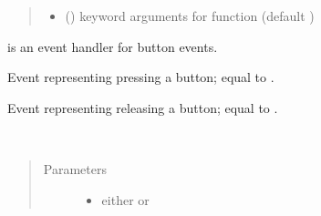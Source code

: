 \documentclass[letterpaper,10pt,english]{sphinxmanual}
\begin{document}
\begin{fulllineitems}
\begin{quote}
\begin{description}
\begin{itemize}
\item {} 
 () \textendash{} keyword arguments for function  (default \sphinxtitleref{\{\}})

\end{itemize}

\end{description}\end{quote}

{\hyperref[\detokenize{index:rcpy.button.ButtonEvent}]{}} is an event handler for button events.

\begin{fulllineitems}
\label{\detokenize{index:rcpy.button.ButtonEvent.PRESSED}}
Event representing pressing a button; equal to {\hyperref[\detokenize{index:rcpy.gpio.InputEvent.LOW}]{}}.

\end{fulllineitems}


\begin{fulllineitems}
\label{\detokenize{index:rcpy.button.ButtonEvent.RELEASED}}
Event representing releasing a button; equal to {\hyperref[\detokenize{index:rcpy.gpio.InputEvent.HIGH}]{}}.

\end{fulllineitems}


\begin{fulllineitems}
\label{\detokenize{index:rcpy.button.ButtonEvent.action}}~\begin{quote}\begin{description}
\item[{Parameters}] \leavevmode\begin{itemize}
\item {} 
 \textendash{} either {\hyperref[\detokenize{index:rcpy.button.PRESSED}]{}} or {\hyperref[\detokenize{index:rcpy.button.RELEASED}]{}}


\end{itemize}
\end{description}
\end{quote}
\end{fulllineitems}
\end{fulllineitems}
\end{document}
